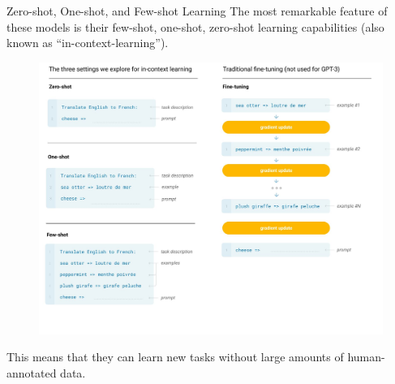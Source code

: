 \documentclass[handout]{beamer}
\begin{document}
\begin{frame}{Zero-shot, One-shot, and Few-shot Learning}
\scriptsize
The most remarkable feature of these models is their few-shot, one-shot, zero-shot learning capabilities (also known as ``in-context-learning'').
 \begin{figure}[h]
        	\includegraphics[scale = 0.12]{pics/zeroonefew.png}
        \end{figure}  

This means that they can learn new tasks without large amounts of human-annotated data.


\end{frame}
\end{document}
